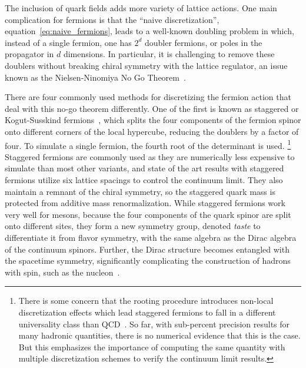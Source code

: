 The inclusion of quark fields adds more variety of lattice actions.
One main complication for fermions is that the ``naive discretization'', equation~\eqref{eq:naive_fermions}, leads to a well-known doubling problem in which, instead of a single fermion, one has $2^d$ doubler fermions, or poles in the propagator in $d$ dimensions.
In particular, it is challenging to remove these doublers without breaking chiral symmetry with the lattice regulator, an issue known as the Nielsen-Ninomiya No Go Theorem~\cite{Nielsen:1981hk,Nielsen:1980rz,Nielsen:1981xu}.

There are four commonly used methods for discretizing the fermion action that deal with this no-go theorem differently.
One of the first is known as staggered or Kogut-Susskind fermions~, which splits the four components of the fermion spinor onto different corners of the local hypercube, reducing the doublers by a factor of four.  To simulate a single fermion, the fourth root of the determinant is used.%
\footnote{There is some concern that the rooting procedure introduces non-local discretization effects which lead staggered fermions to fall in a different universality class than QCD~.
So far, with sub-percent precision results for many hadronic quantities, there is no numerical evidence that this is the case.  But this emphasizes the importance of computing the same quantity with multiple discretization schemes to verify the continuum limit results.}
Staggered fermions are commonly used as they are numerically less expensive to simulate than most other variants, and state of the art results with staggered fermions utilize six lattice spacings to control the continuum limit.
They also maintain a remnant of the chiral symmetry, so the staggered quark mass is protected from additive mass renormalization.
While staggered fermions work very well for mesons,
because the four components of the quark spinor are split onto different sites,
they form a new symmetry group, denoted \textit{taste} to differentiate it from flavor symmetry, with the same algebra as the Dirac algebra of the continuum spinors.
Further, the Dirac structure becomes entangled with the spacetime symmetry, significantly complicating the construction of hadrons with spin, such as the nucleon~.

